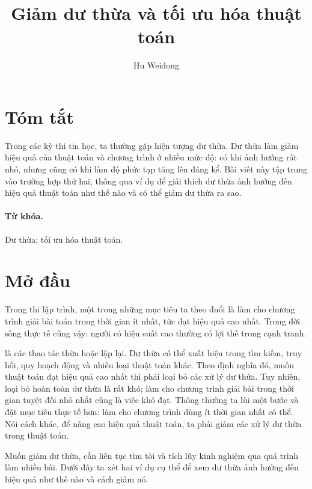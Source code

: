\documentclass[11pt]{article}
\title{Giảm dư thừa và tối ưu hóa thuật toán}
\author{Hu Weidong}
\date{}
\begin{document}
\maketitle


\section*{Tóm tắt}

Trong các kỳ thi tin học, ta thường gặp hiện tượng dư thừa. Dư thừa làm giảm
hiệu quả của thuật toán và chương trình ở nhiều mức độ: có khi ảnh hưởng rất
nhỏ, nhưng cũng có khi làm độ phức tạp tăng lên đáng kể. Bài viết này tập
trung vào trường hợp thứ hai, thông qua ví dụ để giải thích dư thừa ảnh hưởng
đến hiệu quả thuật toán như thế nào và có thể giảm dư thừa ra sao.

\paragraph{Từ khóa.}
Dư thừa; tối ưu hóa thuật toán.

\section{Mở đầu}

Trong thi lập trình, một trong những mục tiêu ta theo đuổi là làm cho chương
trình giải bài toán trong thời gian ít nhất, tức đạt hiệu quả cao nhất. Trong
đời sống thực tế cũng vậy: người có hiệu suất cao thường có lợi thế trong
cạnh tranh.

 là các thao tác thừa hoặc lặp lại. Dư thừa có thể xuất hiện
trong tìm kiếm, truy hồi, quy hoạch động và nhiều loại thuật toán khác.
Theo định nghĩa đó, muốn thuật toán đạt hiệu quả cao nhất thì phải loại bỏ
các xử lý dư thừa. Tuy nhiên, loại bỏ hoàn toàn dư thừa là rất khó; làm cho
chương trình giải bài trong thời gian tuyệt đối nhỏ nhất cũng là việc khó đạt.
Thông thường ta lùi một bước và đặt mục tiêu thực tế hơn: làm cho chương
trình dùng ít thời gian nhất có thể. Nói cách khác, để nâng cao hiệu quả
thuật toán, ta phải giảm các xử lý dư thừa trong thuật toán.

Muốn giảm dư thừa, cần liên tục tìm tòi và tích lũy kinh nghiệm qua quá trình
làm nhiều bài. Dưới đây ta xét hai ví dụ cụ thể để xem dư thừa ảnh hưởng đến
hiệu quả như thế nào và cách giảm nó.
\end{document}
